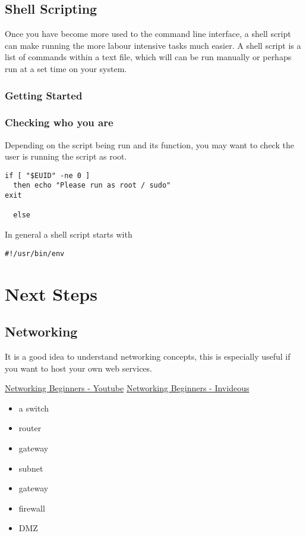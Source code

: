 \documentclass{extbook}
\begin{document}
\section{Shell Scripting}

Once you have become more used to the command line interface, a shell script can make running the more labour intensive tasks much easier.  A shell script is a list of commands within a text file, which will can be run manually or perhaps run at a set time on your system.

\subsection{Getting Started}


\subsection{Checking who you are}

Depending on the script being run and its function, you may want to check the user is running the script as root.  

\begin{verbatim}
if [ "$EUID" -ne 0 ]
  then echo "Please run as root / sudo"
exit

  else
\end{verbatim}

In general a shell script starts with 

\begin{verbatim}
#!/usr/bin/env
\end{verbatim}

\chapter{Next Steps}

\section{Networking}

It is a good idea to understand networking concepts, this is especially useful if you want to host your own web services. 

\href{https://www.youtube.com/watch?v=\_IOZ8\_cPgu8}{Networking Beginners - Youtube}
\href{https://invidious.snopyta.org/watch?v=\_IOZ8\_cPgu8}{Networking Beginners - Invideous}

\begin{itemize}
\item a switch
\item router
\item gateway
\item subnet
\item gateway
\item firewall
\item DMZ
\end{itemize}
\end{document}
